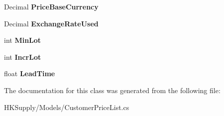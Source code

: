 \begin{DoxyCompactItemize}
Decimal {\bfseries Price\+Base\+Currency}
\item 
\mbox{\label{class_h_k_supply_1_1_models_1_1_customer_price_list_ab80c6ee58019bf9449b2794c3a3bd833}} 
Decimal {\bfseries Exchange\+Rate\+Used}
\item 
\mbox{\label{class_h_k_supply_1_1_models_1_1_customer_price_list_a5ee47e0dc8ca2a8386492e975ede29a5}} 
int {\bfseries Min\+Lot}
\item 
\mbox{\label{class_h_k_supply_1_1_models_1_1_customer_price_list_ad84770e4300c2c1330a3d058a4034361}} 
int {\bfseries Incr\+Lot}
\item 
\mbox{\label{class_h_k_supply_1_1_models_1_1_customer_price_list_a7a5978dabdffe3f73b39113920c84fed}} 
float {\bfseries Lead\+Time}
\end{DoxyCompactItemize}


The documentation for this class was generated from the following file\+:\begin{DoxyCompactItemize}
\item 
H\+K\+Supply/\+Models/Customer\+Price\+List.\+cs\end{DoxyCompactItemize}
